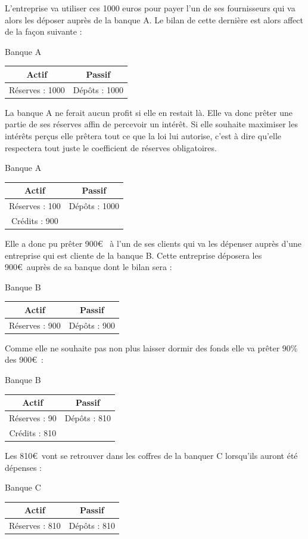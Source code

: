 \documentclass[10pt]{book}
\begin{document}
L'entreprise va utiliser ces 1000 euros pour payer l'un de ses fournisseurs qui va alors les déposer auprès de la banque A. Le bilan de cette dernière est alors affect de la façon suivante : 
\begin{center}
  Banque A \\
  \begin{tabular}{c|c}
    Actif & Passif \\
    \hline
    Réserves : 1000 & Dépôts : 1000
  \end{tabular}
\end{center}
La banque A ne ferait aucun profit si elle en restait là. Elle va donc prêter une partie de ses réserves affin de percevoir un intérêt. Si elle souhaite maximiser les intérêts perçus elle prêtera tout ce que la loi lui autorise, c'est à dire qu'elle respectera tout juste le coefficient de réserves obligatoires.
\begin{center}
  Banque A \\
  \begin{tabular}{c|c}
    Actif & Passif \\
    \hline
    Réserves : 100 & Dépôts : 1000 \\
    Crédits : 900 & 
  \end{tabular}
\end{center}
Elle a donc pu prêter 900\euro~ à l'un de ses clients qui va les dépenser auprès d'une entreprise qui est cliente de la banque B. Cette entreprise déposera les 900\euro~auprès de sa banque dont le bilan sera :
\begin{center}
  Banque B \\
  \begin{tabular}{c|c}
    Actif & Passif \\
    \hline
    Réserves : 900 & Dépôts : 900
  \end{tabular}
\end{center}
Comme elle ne souhaite pas non plus laisser dormir des fonds elle va prêter $90\%$ des 900\euro~:
\begin{center}
  Banque B \\
  \begin{tabular}{c|c}
    Actif & Passif \\
    \hline
    Réserves : 90 & Dépôts : 810 \\
    Crédits : 810 & 
  \end{tabular}
\end{center}
Les 810\euro~vont se retrouver dans les coffres de la banquer C lorsqu'ils auront été dépenses : 
\begin{center}
  Banque C \\
  \begin{tabular}{c|c}
    Actif & Passif \\
    \hline
    Réserves : 810 & Dépôts : 810
  \end{tabular}
\end{center}
\end{document}
